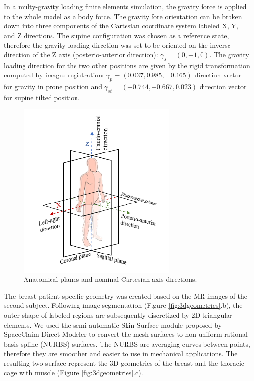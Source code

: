 In a  multy-gravity loading finite elements simulation, the gravity force is applied to the whole model as a body force. The gravity fore orientation can be broken down into three components of the Cartesian coordinate system labeled X, Y, and Z directions. The supine configuration was chosen as a reference state, therefore the gravity loading direction was set to be oriented on the inverse direction  of the Z axis (posterio-anterior direction): $\gamma_s = (0,-1,0)$.   The gravity loading direction for the two other positions are given by the rigid transformation computed by images registration: $\gamma_p = (0.037, 0.985, -0.165)$ direction vector for gravity in prone position and $\gamma_{st} = (-0.744 , -0.667, 0.023)$ direction vector for supine tilted position.

\begin{figure}[!ht]
\centering
\includegraphics[width=0.7\textwidth,keepaspectratio]{figures/xyz_axis_directions.png} 
\caption{Anatomical planes and nominal Cartesian axis directions.}\label{fig:xyz_axis_directions}
\end{figure}


\label{subsection:patientspecificgeometry}

The breast patient-specific geometry was created based on the MR images of the second subject. Following image segmentation (Figure \ref{fig:3dgeometries}.b), the outer shape of labeled regions are subsequently discretized by 2D triangular elements.  We used the semi-automatic Skin Surface module proposed by SpaceClaim Direct Modeler to convert the mesh surfaces to non-uniform rational basis spline (NURBS) surfaces. The NURBS are averaging curves between points, therefore they are smoother and easier to use in mechanical applications. The resulting  two surface represent the 3D geometries of the breast and the thoracic cage with muscle  (Figure \ref{fig:3dgeometries}.c).   
 

